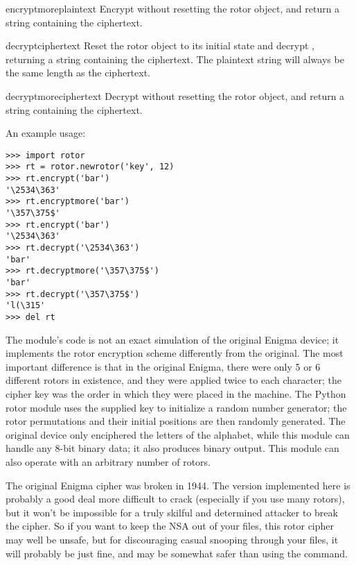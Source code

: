 \begin{funcdesc}{encryptmore}{plaintext}
Encrypt  without resetting the rotor object, and return a
string containing the ciphertext.
\end{funcdesc}

\begin{funcdesc}{decrypt}{ciphertext}
Reset the rotor object to its initial state and decrypt ,
returning a string containing the ciphertext.  The plaintext string will
always be the same length as the ciphertext.
\end{funcdesc}

\begin{funcdesc}{decryptmore}{ciphertext}
Decrypt  without resetting the rotor object, and return a
string containing the ciphertext.
\end{funcdesc}

An example usage:
\begin{verbatim}
>>> import rotor
>>> rt = rotor.newrotor('key', 12)
>>> rt.encrypt('bar')
'\2534\363'
>>> rt.encryptmore('bar')
'\357\375$'
>>> rt.encrypt('bar')
'\2534\363'
>>> rt.decrypt('\2534\363')
'bar'
>>> rt.decryptmore('\357\375$')
'bar'
>>> rt.decrypt('\357\375$')
'l(\315'
>>> del rt
\end{verbatim}
%
The module's code is not an exact simulation of the original Enigma device;
it implements the rotor encryption scheme differently from the original. The
most important difference is that in the original Enigma, there were only 5
or 6 different rotors in existence, and they were applied twice to each
character; the cipher key was the order in which they were placed in the
machine.  The Python rotor module uses the supplied key to initialize a
random number generator; the rotor permutations and their initial positions
are then randomly generated.  The original device only enciphered the
letters of the alphabet, while this module can handle any 8-bit binary data;
it also produces binary output.  This module can also operate with an
arbitrary number of rotors.

The original Enigma cipher was broken in 1944. %
The version implemented here is probably a good deal more difficult to crack
(especially if you use many rotors), but it won't be impossible for
a truly skilful and determined attacker to break the cipher.  So if you want
to keep the NSA out of your files, this rotor cipher may well be unsafe, but
for discouraging casual snooping through your files, it will probably be
just fine, and may be somewhat safer than using the \UNIX{} 
command.
